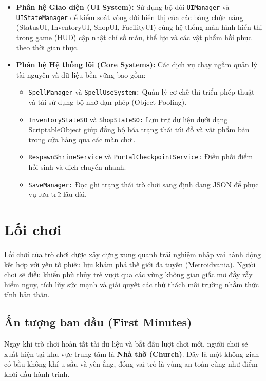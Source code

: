 \documentclass[../DoAn.tex]{subfiles}
\begin{document}
\begin{itemize}
    \item \textbf{Phân hệ Giao diện (UI System):} Sử dụng bộ đôi \texttt{UIManager} và \texttt{UIStateManager} để kiểm soát vòng đời hiển thị của các bảng chức năng (StatusUI, InventoryUI, ShopUI, FacilityUI) cùng hệ thống màn hình hiển thị trong game (HUD) cập nhật chỉ số máu, thể lực và các vật phẩm hồi phục theo thời gian thực.
    \item \textbf{Phân hệ Hệ thống lõi (Core Systems):} Các dịch vụ chạy ngầm quản lý tài nguyên và dữ liệu bền vững bao gồm:
    \begin{itemize}
        \item \texttt{SpellManager} và \texttt{SpellUseSystem:} Quản lý cơ chế thi triển phép thuật và tái sử dụng bộ nhớ đạn phép (Object Pooling).
        \item \texttt{InventoryStateSO} và \texttt{ShopStateSO:} Lưu trữ dữ liệu dưới dạng ScriptableObject giúp đồng bộ hóa trạng thái túi đồ và vật phẩm bán trong cửa hàng qua các màn chơi.
        \item \texttt{RespawnShrineService} và \texttt{PortalCheckpointService:} Điều phối điểm hồi sinh và dịch chuyển nhanh.
        \item \texttt{SaveManager:} Đọc ghi trạng thái trò chơi sang định dạng JSON để phục vụ lưu trữ lâu dài.
    \end{itemize}
\end{itemize}

\section{Lối chơi}
\label{section:3.2}

Lối chơi của trò chơi được xây dựng xung quanh trải nghiệm nhập vai hành động kết hợp với yếu tố phiêu lưu khám phá thế giới đa tuyến (Metroidvania). Người chơi sẽ điều khiển phù thủy trẻ vượt qua các vùng không gian giấc mơ đầy rẫy hiểm nguy, tích lũy sức mạnh và giải quyết các thử thách môi trường nhằm thức tỉnh bản thân.

\subsection{Ấn tượng ban đầu (First Minutes)}
\label{subsection:3.2.1}

Ngay khi trò chơi hoàn tất tải dữ liệu và bắt đầu lượt chơi mới, người chơi sẽ xuất hiện tại khu vực trung tâm là \textbf{Nhà thờ (Church)}. Đây là một không gian có bầu không khí u sầu và yên ắng, đóng vai trò là vùng an toàn cũng như điểm khởi đầu hành trình. 
\end{document}
